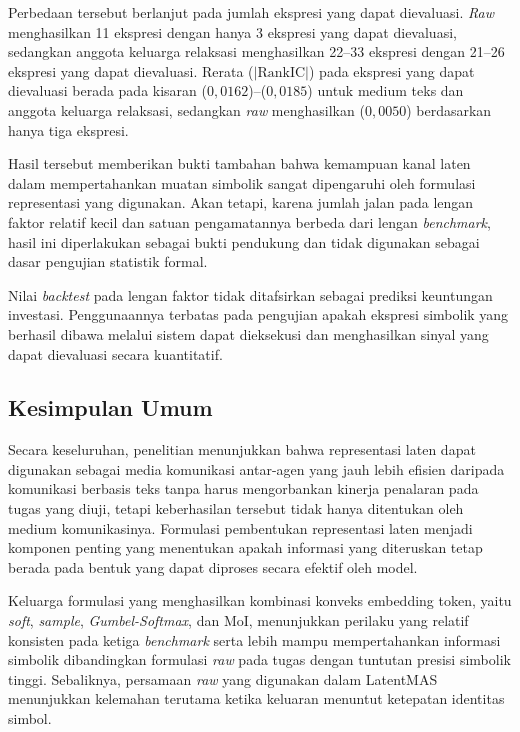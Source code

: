 Perbedaan tersebut berlanjut pada jumlah ekspresi yang dapat dievaluasi.
\textit{Raw} menghasilkan 11 ekspresi dengan hanya 3 ekspresi yang dapat
dievaluasi, sedangkan anggota keluarga relaksasi menghasilkan 22--33 ekspresi
dengan 21--26 ekspresi yang dapat dievaluasi. Rerata
($\lvert\mathrm{RankIC}\rvert$) pada ekspresi yang dapat dievaluasi berada
pada kisaran ($0{,}0162$)--($0{,}0185$) untuk medium teks dan anggota keluarga
relaksasi, sedangkan \textit{raw} menghasilkan ($0{,}0050$) berdasarkan hanya
tiga ekspresi.

Hasil tersebut memberikan bukti tambahan bahwa kemampuan kanal laten dalam
mempertahankan muatan simbolik sangat dipengaruhi oleh formulasi representasi
yang digunakan. Akan tetapi, karena jumlah jalan pada lengan faktor relatif
kecil dan satuan pengamatannya berbeda dari lengan \textit{benchmark}, hasil
ini diperlakukan sebagai bukti pendukung dan tidak digunakan sebagai dasar
pengujian statistik formal.

Nilai \textit{backtest} pada lengan faktor tidak ditafsirkan sebagai prediksi
keuntungan investasi. Penggunaannya terbatas pada pengujian apakah ekspresi
simbolik yang berhasil dibawa melalui sistem dapat dieksekusi dan menghasilkan
sinyal yang dapat dievaluasi secara kuantitatif.

\subsection{Kesimpulan Umum}

Secara keseluruhan, penelitian menunjukkan bahwa representasi laten dapat
digunakan sebagai media komunikasi antar-agen yang jauh lebih efisien daripada
komunikasi berbasis teks tanpa harus mengorbankan kinerja penalaran pada tugas
yang diuji, tetapi keberhasilan tersebut tidak hanya ditentukan oleh medium
komunikasinya. Formulasi pembentukan representasi laten menjadi komponen
penting yang menentukan apakah informasi yang diteruskan tetap berada pada
bentuk yang dapat diproses secara efektif oleh model.

Keluarga formulasi yang menghasilkan kombinasi konveks embedding token,
yaitu \textit{soft}, \textit{sample}, \textit{Gumbel-Softmax}, dan MoI,
menunjukkan perilaku yang relatif konsisten pada ketiga \textit{benchmark}
serta lebih mampu mempertahankan informasi simbolik dibandingkan formulasi
\textit{raw} pada tugas dengan tuntutan presisi simbolik tinggi. Sebaliknya,
persamaan \textit{raw} yang digunakan dalam LatentMAS menunjukkan kelemahan
terutama ketika keluaran menuntut ketepatan identitas simbol.

